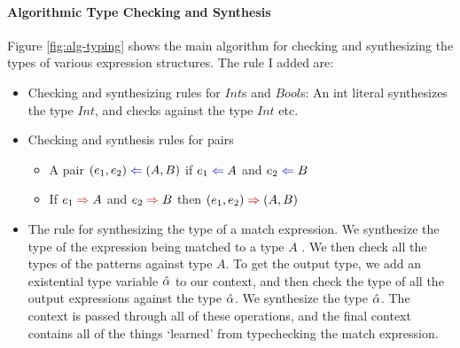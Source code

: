 \paragraph{Algorithmic Type Checking and Synthesis} Figure \ref{fig:alg-typing} shows the main algorithm for checking and synthesizing the types of various expression structures. The rule I added are: 
\begin{itemize}
    \item Checking and synthesizing rules for $Int$s and $Bool$s: An int literal synthesizes the type $Int$, and checks against the type $Int$ etc. 
    \item Checking and synthesis rules for pairs
    \begin{itemize}
        \item A pair $(e_1, e_2) \chk (A, B)$ if $e_1 \chk A$ and $e_2 \chk B$
        \item If $e_1 \syn A$ and $e_2 \syn B$ then $(e_1, e_2) \syn (A, B)$ 
    \end{itemize}
    \item The rule for synthesizing the type of a match expression. We synthesize the type of the expression being matched to a type $A$ . We then check all the types of the patterns against type $A$. To get the output type, we add an existential type variable $\hat{\alpha}$ to our context, and then check the type of all the output expressions against the type $\hat{\alpha}$. We synthesize the type $\hat{\alpha}$. The context is passed through all of these operations, and the final context contains all of the things `learned' from typechecking the match expression. 
\end{itemize}

